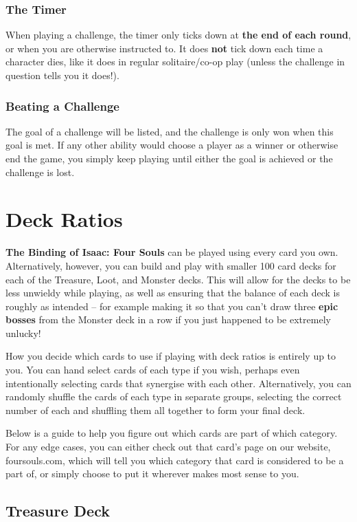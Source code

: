 \documentclass[a4paper, twoside]{report} %
\begin{document}
    \subsection*{The Timer}
    When playing a challenge, the timer only ticks down at \textbf{the end of each round}, or when you are otherwise instructed to. It does \textbf{not} tick down each time a character dies, like it does in regular solitaire/co-op play (unless the challenge in question tells you it does!).

    \subsection*{Beating a Challenge}
    The goal of a challenge will be listed, and the challenge is only won when this goal is met. If any other ability would choose a player as a winner or otherwise end the game, you simply keep playing until either the goal is achieved or the challenge is lost.

    \chapter{Deck Ratios}
    \textbf{The Binding of Isaac: Four Souls} can be played using every card you own. Alternatively, however, you can build and play with smaller 100 card decks for each of the Treasure, Loot, and Monster decks. This will allow for the decks to be less unwieldy while playing, as well as ensuring that the balance of each deck is roughly as intended – for example making it so that you can’t draw three \textbf{epic bosses} from the Monster deck in a row if you just happened to be extremely unlucky!

    How you decide which cards to use if playing with deck ratios is entirely up to you. You can hand select cards of each type if you wish, perhaps even intentionally selecting cards that synergise with each other. Alternatively, you can randomly shuffle the cards of each type in separate groups, selecting the correct number of each and shuffling them all together to form your final deck.

    Below is a guide to help you figure out which cards are part of which category. For any edge cases, you can either check out that card’s page on our website, foursouls.com, which will tell you which category that card is considered to be a part of, or simply choose to put it wherever makes most sense to you.

    \section{Treasure Deck}
\end{document}

